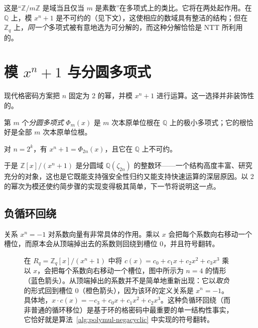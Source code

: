 这是“$\mathbb{Z}/m\mathbb{Z}$ 是域当且仅当 $m$ 是素数”在多项式上的类比。它将在两处起作用。在 $\mathbb{Q}$ 上，模 $x^n+1$ 是不可约的（见下文），这使相应的数域具有整洁的结构；但在 $\mathbb{Z}_q$ 上，\emph{同一个}多项式被有意地选为可分解的，而这种分解恰恰是 NTT 所利用的。

\section{模 $x^n+1$ 与分圆多项式}
现代格密码方案把 $n$ 固定为 2 的幂，并模 $x^n+1$ 进行运算。这一选择并非装饰性的。

\begin{definition}[分圆多项式]
第 $m$ 个\emph{分圆多项式} $\Phi_m(x)$ 是 $m$ 次本原单位根在 $\mathbb{Q}$ 上的极小多项式；它的根恰好是全部 $m$ 次本原单位根。
\end{definition}

\begin{proposition}
对 $n=2^k$，有 $x^n+1 = \Phi_{2n}(x)$，且它在 $\mathbb{Q}$ 上不可约。
\end{proposition}

于是 $\mathbb{Z}[x]/(x^n+1)$ 是分圆域 $\mathbb{Q}(\zeta_{2n})$ 的整数环——一个结构高度丰富、研究充分的对象，这也是它既能支持强安全性归约又能支持快速运算的深层原因。以 2 的幂次为模还使约简步骤的实现变得极其简单，下一节将说明这一点。

\subsection{负循环回绕}
关系 $x^n=-1$ 对系数向量有非常具体的作用。乘以 $x$ 会把每个系数向右移动一个槽位，而原本会从顶端掉出去的系数则回绕到槽位 $0$，并且符号翻转。

\begin{figure}[H]
\centering
{}
\caption{在 $R_q=\mathbb{Z}_q[x]/(x^n+1)$ 中将 $c(x)=c_0+c_1x+c_2x^2+c_3x^3$ 乘以 $x$，会把每个系数向右移动一个槽位，图中所示为 $n=4$ 的情形（蓝色箭头）。从顶端掉出的系数并不是简单地重新出现：它以\emph{取负}的形式回到槽位 $0$（橙色箭头），因为该环的定义关系是 $x^n=-1$。具体地，$x\cdot c(x) = -c_3 + c_0x + c_1x^2 + c_2x^3$。这种负循环回绕（而非普通的循环移位）是基于环的格密码中最重要的单一结构性事实，它恰好就是算法~\ref{alg:polymul-negacyclic} 中实现的符号翻转。}
\label{fig:negacyclic-wrap}
\end{figure}

